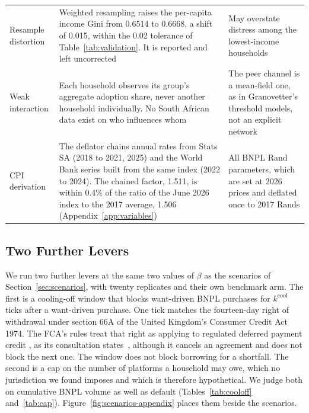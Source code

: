 \begin{longtable}{@{}L{3.1cm}L{6.5cm}L{4.45cm}@{}}
\addlinespace
Resample distortion & Weighted resampling raises the per-capita income Gini from 0.6514 to 0.6668,
a shift of 0.015, within the 0.02 tolerance of Table~\ref{tab:validation}. It is reported and left uncorrected & May overstate distress among the lowest-income households \\
\addlinespace
Weak interaction & Each household observes its group's aggregate adoption share, never another
household individually. No South African data exist on who influences whom & The peer channel
is a mean-field one, as in Granovetter's threshold models, not an explicit network \\
\addlinespace
\ac{CPI} derivation & The deflator chains annual rates from Stats SA (2018 to 2021, 2025) and the World Bank series built from the same index (2022 to 2024). The chained factor, 1.511, is within 0.4\% of the ratio of the June 2026 index to the 2017 average, 1.506 (Appendix~\ref{app:variables}) &
All \ac{BNPL} Rand parameters, which are set at 2026 prices and deflated once to 2017
Rands \\
\end{longtable}
\endgroup

\subsection{Two Further Levers}
\label{app:levers}

We run two further levers at the same two values of $\beta$ as the
scenarios of Section~\ref{sec:scenarios}, with twenty replicates and their own benchmark arm. The first is a cooling-off window that blocks want-driven
\ac{BNPL} purchases for $k^{\text{cool}}$ ticks after a want-driven purchase. One tick matches the
fourteen-day right of withdrawal under section 66A of the United Kingdom's Consumer Credit Act
1974. The \ac{FCA}'s rules treat that right as applying to regulated deferred payment credit
\citep{fca_ps26_1}, as its consultation states~\citep[Table~1, p.~17]{fca_cp25_23}, although it cancels an agreement and does not block the next one. The window
does not block borrowing for a shortfall. The second is a cap on the number of platforms a household
may owe, which no jurisdiction we found imposes and which is therefore hypothetical. We judge both
on cumulative \ac{BNPL} volume as well as default (Tables~\ref{tab:cooloff} and~\ref{tab:cap}).
Figure~\ref{fig:scenarios-appendix} places them beside the scenarios.

